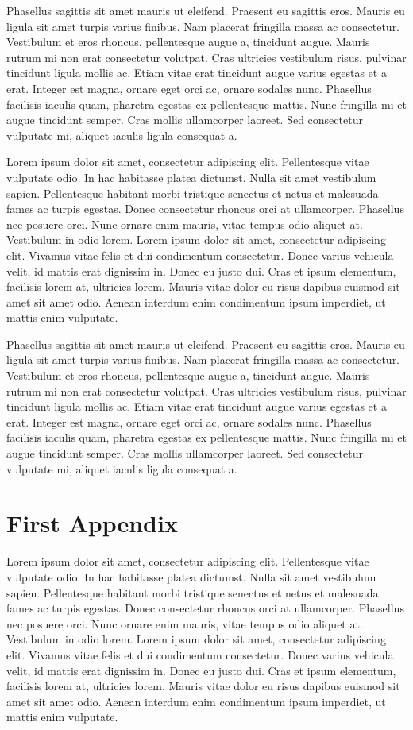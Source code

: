 \documentclass{book}
\begin{document}
Phasellus sagittis sit amet mauris ut eleifend. Praesent eu sagittis eros. Mauris eu ligula sit amet turpis varius finibus. Nam placerat fringilla massa ac consectetur. Vestibulum et eros rhoncus, pellentesque augue a, tincidunt augue. Mauris rutrum mi non erat consectetur volutpat. Cras ultricies vestibulum risus, pulvinar tincidunt ligula mollis ac. Etiam vitae erat tincidunt augue varius egestas et a erat. Integer est magna, ornare eget orci ac, ornare sodales nunc. Phasellus facilisis iaculis quam, pharetra egestas ex pellentesque mattis. Nunc fringilla mi et augue tincidunt semper. Cras mollis ullamcorper laoreet. Sed consectetur vulputate mi, aliquet iaculis ligula consequat a.

Lorem ipsum dolor sit amet, consectetur adipiscing elit. Pellentesque vitae vulputate odio. In hac habitasse platea dictumst. Nulla sit amet vestibulum sapien. Pellentesque habitant morbi tristique senectus et netus et malesuada fames ac turpis egestas. Donec consectetur rhoncus orci at ullamcorper. Phasellus nec posuere orci. Nunc ornare enim mauris, vitae tempus odio aliquet at. Vestibulum in odio lorem. Lorem ipsum dolor sit amet, consectetur adipiscing elit. Vivamus vitae felis et dui condimentum consectetur. Donec varius vehicula velit, id mattis erat dignissim in. Donec eu justo dui. Cras et ipsum elementum, facilisis lorem at, ultricies lorem. Mauris vitae dolor eu risus dapibus euismod sit amet sit amet odio. Aenean interdum enim condimentum ipsum imperdiet, ut mattis enim vulputate.

Phasellus sagittis sit amet mauris ut eleifend. Praesent eu sagittis eros. Mauris eu ligula sit amet turpis varius finibus. Nam placerat fringilla massa ac consectetur. Vestibulum et eros rhoncus, pellentesque augue a, tincidunt augue. Mauris rutrum mi non erat consectetur volutpat. Cras ultricies vestibulum risus, pulvinar tincidunt ligula mollis ac. Etiam vitae erat tincidunt augue varius egestas et a erat. Integer est magna, ornare eget orci ac, ornare sodales nunc. Phasellus facilisis iaculis quam, pharetra egestas ex pellentesque mattis. Nunc fringilla mi et augue tincidunt semper. Cras mollis ullamcorper laoreet. Sed consectetur vulputate mi, aliquet iaculis ligula consequat a.
\appendix
\chapter{First Appendix}
Lorem ipsum dolor sit amet, consectetur adipiscing elit. Pellentesque vitae vulputate odio. In hac habitasse platea dictumst. Nulla sit amet vestibulum sapien. Pellentesque habitant morbi tristique senectus et netus et malesuada fames ac turpis egestas. Donec consectetur rhoncus orci at ullamcorper. Phasellus nec posuere orci. Nunc ornare enim mauris, vitae tempus odio aliquet at. Vestibulum in odio lorem. Lorem ipsum dolor sit amet, consectetur adipiscing elit. Vivamus vitae felis et dui condimentum consectetur. Donec varius vehicula velit, id mattis erat dignissim in. Donec eu justo dui. Cras et ipsum elementum, facilisis lorem at, ultricies lorem. Mauris vitae dolor eu risus dapibus euismod sit amet sit amet odio. Aenean interdum enim condimentum ipsum imperdiet, ut mattis enim vulputate.
\end{document}
